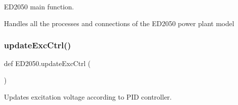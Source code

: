 \begin{DoxyVerb}ED2050 main function.

Handles all the processes and connections of the ED2050 power plant model
\end{DoxyVerb}
 \mbox{\label{namespaceED2050_a4331a4fa9979e638e9caca79e314eb85}} 
\subsubsection{\texorpdfstring{update\+Exc\+Ctrl()}{updateExcCtrl()}}
{\footnotesize\ttfamily def E\+D2050.\+update\+Exc\+Ctrl (\begin{DoxyParamCaption}{ }\end{DoxyParamCaption})}

\begin{DoxyVerb}Updates excitation voltage according to PID controller. 
\end{DoxyVerb}
 